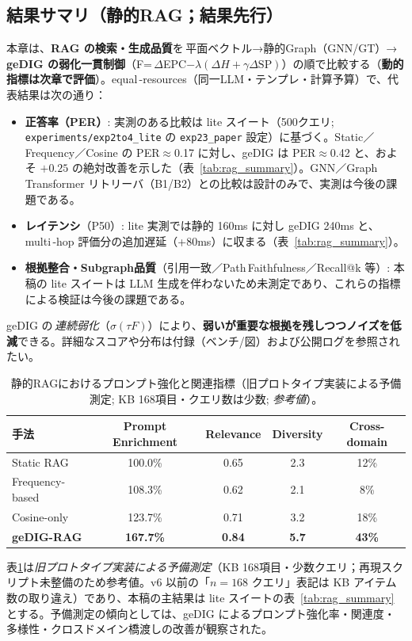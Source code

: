 \documentclass[ja=standard,xelatex]{bxjsarticle}
\begin{document}
\subsection{結果サマリ（静的RAG；結果先行）}
\label{sec:rag_result_summary}
本章は、\textbf{RAG の検索・生成品質}を\,平面ベクトル→静的Graph（GNN/GT）→\,\textbf{geDIG の弱化一貫制御}（F=\,$\Delta$EPC$-\lambda(\Delta H+\gamma\Delta\mathrm{SP})$）の順で比較する（\textbf{動的指標は次章で評価}）。equal\,\mbox{-}resources（同一LLM・テンプレ・計算予算）で、代表結果は次の通り：
\begin{itemize}[leftmargin=1.6em]
  \item \textbf{正答率（PER）}: 実測のある比較は lite スイート（500クエリ; \texttt{experiments/exp2to4\_lite} の \texttt{exp23\_paper} 設定）に基づく。Static／Frequency／Cosine の PER$\approx$0.17 に対し、geDIG は PER$\approx$0.42 と、およそ $+0.25$ の絶対改善を示した（表~\ref{tab:rag_summary}）。GNN／Graph\,Transformer リトリーバ（B1/B2）との比較は設計のみで、実測は今後の課題である。
  \item \textbf{レイテンシ}（P50）: lite 実測では静的 160ms に対し geDIG 240ms と、multi\,\mbox{-}hop 評価分の追加遅延（+80ms）に収まる（表~\ref{tab:rag_summary}）。
  \item \textbf{根拠整合・Subgraph品質}（引用一致／Path\,Faithfulness／Recall@k 等）: 本稿の lite スイートは LLM 生成を伴わないため未測定であり、これらの指標による検証は今後の課題である。
\end{itemize}
\noindent geDIG の\,\emph{連続弱化}（$\sigma(\tau F)$）により、\textbf{弱いが重要な根拠を残しつつノイズを低減}できる。詳細なスコアや分布は付録（ベンチ/図）および公開ログを参照されたい。

\begin{table}[H]
\centering
\small
\caption{静的RAGにおけるプロンプト強化と関連指標（旧プロトタイプ実装による予備測定; KB 168項目・クエリ数は少数; \emph{参考値}）。}
\label{tab:rag_static_enrichment}
\begin{tabular}{lcccc}
\toprule
手法 & Prompt Enrichment & Relevance & Diversity & Cross-domain \\
\midrule
Static RAG & 100.0\% & 0.65 & 2.3 & 12\% \\
Frequency-based & 108.3\% & 0.62 & 2.1 & 8\% \\
Cosine-only & 123.7\% & 0.71 & 3.2 & 18\% \\
\textbf{geDIG-RAG} & \textbf{167.7\%} & \textbf{0.84} & \textbf{5.7} & \textbf{43\%} \\
\bottomrule
\end{tabular}
\end{table}
\noindent 表\ref{tab:rag_static_enrichment}は\emph{旧プロトタイプ実装による予備測定}（KB 168項目・少数クエリ；再現スクリプト未整備のため参考値。v6 以前の「$n{=}168$ クエリ」表記は KB アイテム数の取り違え）であり、本稿の主結果は lite スイートの表~\ref{tab:rag_summary} とする。予備測定の傾向としては、geDIG によるプロンプト強化率・関連度・多様性・クロスドメイン橋渡しの改善が観察された。
\end{document}
